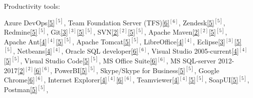 \begin{cventries}
  \cventry
    {Productivity tools:} %
    {} %
    {} %
    {} %
    {
      \vspace{0.1cm}
      \begin{cvitems} %
        \item[] {        
        \textcolor{rainbowcolor-olive}{Azure DevOps\ref{5}{$^{[5]}$}},         
        \textcolor{rainbowcolor-olive}{Team Foundation Server (TFS)\ref{6}{$^{[6]}$}},
        \textcolor{rainbowcolor-olive}{Zendesk\ref{5}{$^{[5]}$}},
        \textcolor{rainbowcolor-olive}{Redmine\ref{5}{$^{[5]}$}},
        \textcolor{rainbowcolor-olive}{Git\ref{3}{$^{[3]}$}\ref{5}{$^{[5]}$}}, 
        \textcolor{rainbowcolor-olive}{SVN\ref{2}{$^{[2]}$}\ref{5}{$^{[5]}$}},
        \textcolor{rainbowcolor-olive}{Apache Maven\ref{2}{$^{[2]}$}\ref{5}{$^{[5]}$}},
        \textcolor{rainbowcolor-olive}{Apache Ant\ref{4}{$^{[4]}$}\ref{5}{$^{[5]}$}},  
        \textcolor{rainbowcolor-olive}{Apache Tomcat\ref{5}{$^{[5]}$}}, 
        \textcolor{rainbowcolor-olive}{LibreOffice\ref{4}{$^{[4]}$}}, 
        \textcolor{rainbowcolor-olive}{Eclipse\ref{3}{$^{[3]}$}\ref{5}{$^{[5]}$}},  
        \textcolor{rainbowcolor-olive}{Netbeans\ref{4}{$^{[4]}$}}, 
        \textcolor{rainbowcolor-olive}{Oracle SQL developer\ref{6}{$^{[6]}$}},
        \textcolor{rainbowcolor-olive}{Visual Studio 2005-current\ref{4}{$^{[4]}$}\ref{5}{$^{[5]}$}},
        \textcolor{rainbowcolor-olive}{Visual Studio Code\ref{5}{$^{[5]}$}},
        \textcolor{rainbowcolor-olive}{MS Office Suite\ref{6}{$^{[6]}$}},
        \textcolor{rainbowcolor-olive}{MS SQL-server 2012-2017\ref{2}{$^{[2]}$}\ref{6}{$^{[6]}$}},
		\textcolor{rainbowcolor-olive}{PowerBI\ref{5}{$^{[5]}$}}, 
        \textcolor{rainbowcolor-olive}{Skype/Skype for Business\ref{5}{$^{[5]}$}},
        \textcolor{rainbowcolor-olive}{Google Chrome\ref{6}{$^{[6]}$}},                
        \textcolor{rainbowcolor-olive}{Internet Explorer\ref{4}{$^{[4]}$}\ref{6}{$^{[6]}$}},
        \textcolor{rainbowcolor-olive}{Teamviewer\ref{4}{$^{[4]}$}\ref{5}{$^{[5]}$}},
        \textcolor{rainbowcolor-olive}{SoapUI\ref{5}{$^{[5]}$}},
        \textcolor{rainbowcolor-olive}{Postman\ref{5}{$^{[5]}$}},
}
\end{cvitems}}
\end{cventries}
